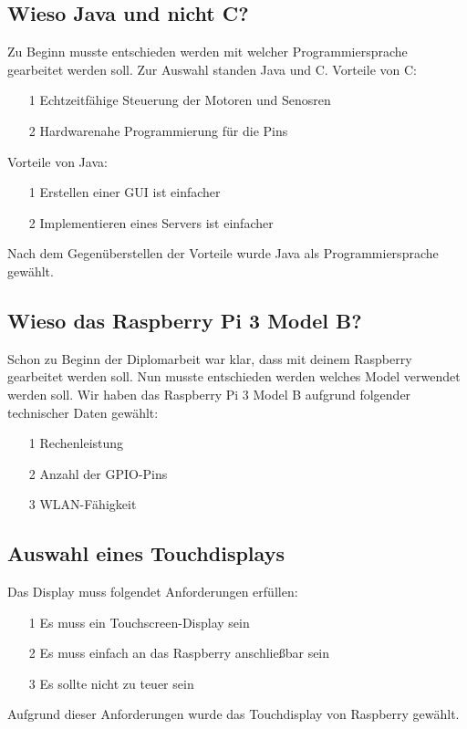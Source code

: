\subsection{Wieso Java und nicht C?}
Zu Beginn musste entschieden werden mit welcher Programmiersprache gearbeitet werden soll. Zur Auswahl standen Java und C.
Vorteile von C:
\begin{itemize}
\item[1] Echtzeitfähige Steuerung der Motoren und Senosren
\item[2] Hardwarenahe Programmierung für die Pins
\end{itemize}
Vorteile von Java:
\begin{itemize}
\item[1] Erstellen einer GUI ist einfacher
\item[2] Implementieren eines Servers ist einfacher
\end{itemize}

Nach dem Gegenüberstellen der Vorteile wurde Java als Programmiersprache gewählt.

\subsection{Wieso das Raspberry Pi 3 Model B?}
Schon zu Beginn der Diplomarbeit war klar, dass mit deinem Raspberry gearbeitet werden soll. Nun musste entschieden werden welches Model verwendet werden soll. Wir haben das Raspberry Pi 3 Model B aufgrund folgender technischer Daten gewählt:
\begin{itemize}
\item[1] Rechenleistung
\item[2] Anzahl der GPIO-Pins
\item[3] WLAN-Fähigkeit
\end{itemize}

\subsection{Auswahl eines Touchdisplays}
Das Display muss folgendet Anforderungen erfüllen:
\begin{itemize}
\item[1] Es muss ein Touchscreen-Display sein
\item[2] Es muss einfach an das Raspberry anschließbar sein
\item[3] Es sollte nicht zu teuer sein
\end{itemize}

Aufgrund dieser Anforderungen wurde das Touchdisplay von Raspberry gewählt.

